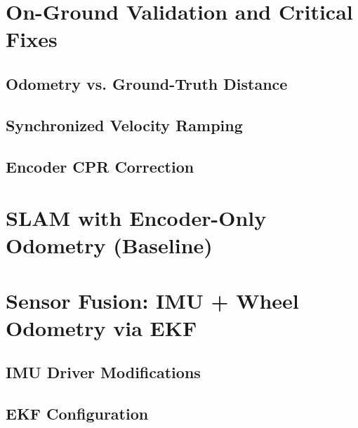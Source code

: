 \section{On-Ground Validation and Critical Fixes}
\label{sec:onground_validation}

\subsection{Odometry vs. Ground-Truth Distance}
\label{subsec:odom_vs_truth}

\subsection{Synchronized Velocity Ramping}
\label{subsec:ramp_input_fix}

\subsection{Encoder CPR Correction}
\label{subsec:cpr_correction}

\section{SLAM with Encoder-Only Odometry (Baseline)}
\label{sec:slam_baseline}

\section{Sensor Fusion: IMU + Wheel Odometry via EKF}
\label{sec:ekf_fusion_hw}

\subsection{IMU Driver Modifications}
\label{subsec:imu_driver_mods}

\subsection{EKF Configuration}
\label{subsec:ekf_config_hw}

